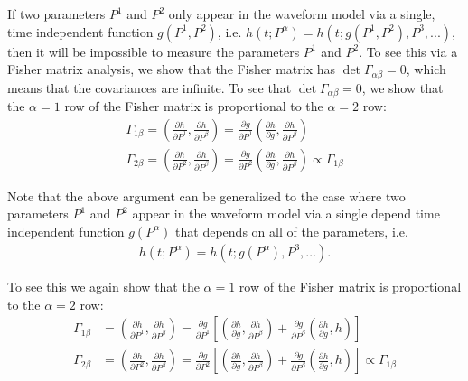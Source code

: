 \documentclass[aps,prd,amsmath,showpacs,amssymb,superscriptaddress,nofootinbib,longbibliography,eqsecnum,preprintnumbers]{revtex4-1}
\begin{document}
If two parameters $P^1$ and $P^2$ only appear in the waveform model via a single, time independent function $g(P^1, P^2)$, i.e. $h(t;P^\alpha)=h(t;g(P^1 ,P^2),P^3, ...)$, then it will be impossible to measure the parameters $P^1$ and $P^2$. To see this via a Fisher matrix analysis, we show that the Fisher matrix has $\det \Gamma_{\alpha \beta}=0$, which means that the covariances are infinite. To see that  $\det \Gamma_{\alpha \beta}=0$, we show that the $\alpha =1$ row of the Fisher matrix is proportional to the $\alpha =2$ row:
\begin{align}
\Gamma_{1\beta}=\left(\frac{\partial h}{\partial P^1},\frac{\partial h}{\partial P^\beta}\right)=\frac{\partial g}{\partial P^1}\left(\frac{\partial h}{\partial g},\frac{\partial h}{\partial P^\beta}\right) \nonumber \\
\Gamma_{2\beta}=\left(\frac{\partial h}{\partial P^2},\frac{\partial h}{\partial P^\beta}\right)=\frac{\partial g}{\partial P^2}\left(\frac{\partial h}{\partial g},\frac{\partial h}{\partial P^\beta}\right) \propto \Gamma_{1\beta}
\end{align}

Note that the above argument can be generalized to the case where two parameters $P^1$ and $P^2$ appear in the waveform model via a single depend time independent function $g(P^\alpha)$ that depends on all of the parameters, i.e.
\begin{align}
h(t;P^\alpha)=h(t;g(P^\alpha),P^3,\dots). 
\end{align}

To see this we again show that the $\alpha =1$ row of the Fisher matrix is proportional to the $\alpha =2$ row:
\begin{align}
\Gamma_{1\beta}&=\left(\frac{\partial h}{\partial P^1},\frac{\partial h}{\partial P^\beta}\right)=\frac{\partial g}{\partial P^1}\left[\left(\frac{\partial h}{\partial g},\frac{\partial h}{\partial P^\beta}\right)
+\frac{\partial g}{\partial P^\beta}\left(\frac{\partial h}{\partial g}, h\right)
\right]\nonumber \\
\Gamma_{2\beta}&=\left(\frac{\partial h}{\partial P^2},\frac{\partial h}{\partial P^\beta}\right)=\frac{\partial g}{\partial P^2}\left[\left(\frac{\partial h}{\partial g},\frac{\partial h}{\partial P^\beta}\right)
+\frac{\partial g}{\partial P^\beta}\left(\frac{\partial h}{\partial g}, h\right)
\right] \propto \Gamma_{1\beta}
\end{align}
\end{document}
